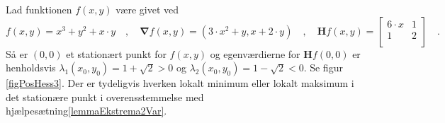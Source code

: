\begin{example} \label{exampApprox3grad}
Lad funktionen $f(x,y)$ være givet ved
\begin{equation*}
f(x,y) = x^{3} + y^{2} + x\cdot y \quad , \quad \bm{\nabla}f(x,y) = (3\cdot x^{2} + y, x + 2\cdot y) \quad , \quad \mathbf{H}f(x, y) = \left[
                                                                                                  \begin{array}{cc}
                                                                                                    6\cdot x & 1 \\
                                                                                                    1 & 2 \\
                                                                                                  \end{array}
                                                                                                \right] \quad .
\end{equation*}
Så er $(0,0)$ et stationært punkt for $f(x,y)$ og egenværdierne for $\mathbf{H}f(0,0)$ er henholdsvis $\lambda_{1}(x_{0}, y_{0}) = 1 + \sqrt{2} > 0 $ og $\lambda_{2}(x_{0}, y_{0}) = 1 - \sqrt{2} < 0$. Se figur \ref{figPosHess3}. Der er tydeligvis hverken lokalt minimum eller lokalt maksimum i det stationære punkt i overensstemmelse med hjælpesætning\ref{lemmaEkstrema2Var}.
\end{example}


